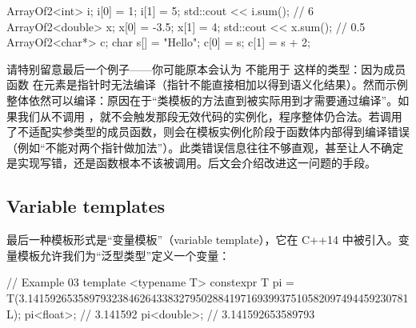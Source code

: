 \begin{code}
ArrayOf2<int> i; i[0] = 1; i[1] = 5;
std::cout << i.sum();                       // 6
ArrayOf2<double> x; x[0] = -3.5; x[1] = 4;
std::cout << x.sum();                       // 0.5
ArrayOf2<char*> c; char s[] = "Hello";
c[0] = s; c[1] = s + 2;
\end{code}

请特别留意最后一个例子——你可能原本会认为  不能用于  这样的类型：因为成员函数  在元素是指针时无法编译（指针不能直接相加以得到语义化结果）。然而示例整体依然可以编译：原因在于“类模板的方法直到被实际用到才需要通过编译”。如果我们从不调用 ，就不会触发那段无效代码的实例化，程序整体仍合法。若调用了不适配实参类型的成员函数，则会在模板实例化阶段于函数体内部得到编译错误（例如“不能对两个指针做加法”）。此类错误信息往往不够直观，甚至让人不确定是实现写错，还是函数根本不该被调用。后文会介绍改进这一问题的手段。

\subsection{Variable templates}
最后一种模板形式是“变量模板”（variable template），它在 C++14 中被引入。变量模板允许我们为“泛型类型”定义一个变量：

\begin{code}
// Example 03
template <typename T>
constexpr T pi = T(3.14159265358979323846264338327950288419716939937510582097494459230781L);
pi<float>;      // 3.141592
pi<double>;     // 3.141592653589793
\end{code}

